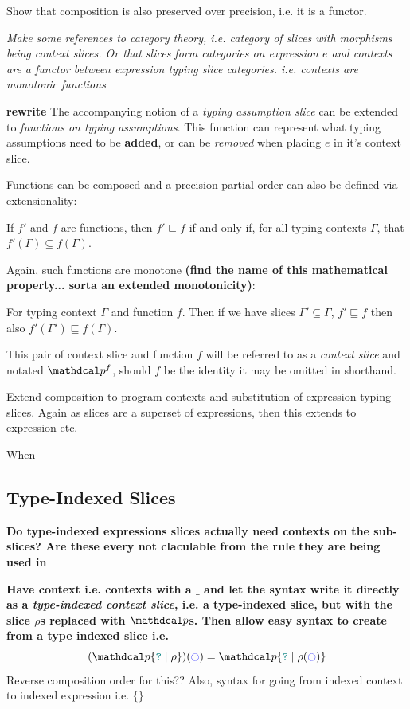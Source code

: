 Show that composition is also preserved over precision, i.e. it is a functor.

\textit{Make some references to category theory, i.e. category of slices with morphisms being context slices. Or that slices form categories on expression $e$ and contexts are a functor between expression typing slice categories. i.e. contexts are monotonic functions}

\textbf{rewrite}
The accompanying notion of a \textit{typing assumption slice} can be extended to \textit{functions on typing assumptions}. This function can represent what typing assumptions need to be \textbf{added}, or can be \textit{removed} when placing $e$ in it's context slice.

Functions can be composed and a precision partial order can also be defined via extensionality:
\begin{definition}\label{def:FunctionPrecision}
If $f'$ and $f$ are functions, then $f' \sqsubseteq f$ if and only if, for all typing contexts $\Gamma$, that $f'(\Gamma) \subseteq f(\Gamma)$.
\end{definition}
Again, such functions are monotone \textbf{(find the name of this mathematical property... sorta an extended monotonicity)}:
\begin{conjecture}
For typing context $\Gamma$ and function $f$. Then if we have slices $\Gamma' \subseteq \Gamma$, $f' \sqsubseteq f$ then also $f'(\Gamma') \sqsubseteq f(\Gamma)$.
\end{conjecture}

This pair of context slice and function $f$ will be referred to as a \textit{context slice} and notated $\p^f$, should $f$ be the identity it may be omitted in shorthand.

Extend composition to program contexts and substitution of expression typing slices. Again as slices are a superset of expressions, then this extends to expression etc.

When 

\subsection{Type-Indexed Slices}\label{sec:TypeIndexedSlices}
\textbf{Do type-indexed expressions slices actually need contexts on the sub-slices? Are these every not claculable from the rule they are being used in}

\textbf{Have context i.e. contexts with a $\_$ and let the syntax write it directly as a \textit{type-indexed context slice}, i.e. a type-indexed slice, but with the slice $\rho$s replaced with $\p$s. Then allow easy syntax to create from a type indexed slice i.e.}
\[(\p\{\dyn \mid \rho\})(\cmark) = \p\{\dyn \mid \rho(\cmark)\}\]
Reverse composition order for this?? Also, syntax for going from indexed context to indexed expression i.e. $\{\}$


